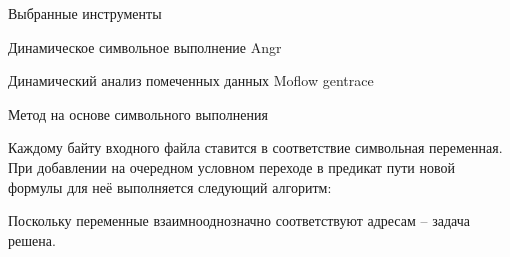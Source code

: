 \documentclass[10pt]{beamer}
\begin{document}
\begin{frame}{Выбранные инструменты}
    \begin{block}{Динамическое символьное выполнение}
      Angr
    \end{block}
    \begin{block}{Динамический анализ помеченных данных}
        Moflow gentrace
    \end{block}
\end{frame}


\begin{frame}{Метод на основе символьного выполнения}

Каждому байту входного файла ставится в соответствие символьная переменная.
При добавлении на очередном условном переходе в предикат пути новой формулы для неё выполняется следующий алгоритм:

\begin{algorithm}[H]
\SetAlgoLined
{}
  \caption{Метод на основе символьного выполнения}
\end{algorithm}
Поскольку переменные взаимнооднозначно соответствуют адресам -- задача решена.
\end{frame}


\end{document}
